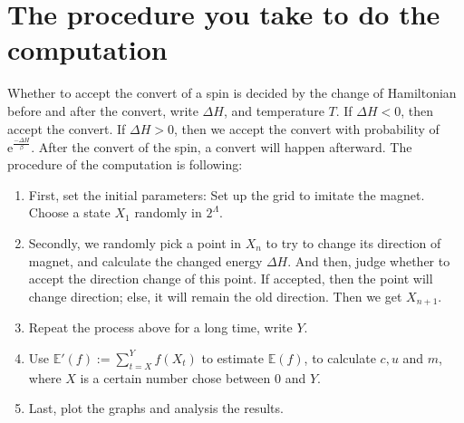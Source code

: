\documentclass[11pt,openany]{book}              %
\begin{document}
\section{The procedure you take to do the computation}
Whether to accept the convert of a spin is decided by the change of Hamiltonian before and after the convert, write \(\Delta H\), and temperature \(T\).
If \(\Delta H<0\), then accept the convert.
If \(\Delta H > 0 \), then we accept the convert with probability of \(\mathrm{e}^{\frac{- \Delta H}{\beta}}\).
After the convert of the spin, a convert will happen afterward.
The procedure of the computation is following:
\begin{enumerate}
	\item First, set the initial parameters: Set up the grid to imitate the magnet.
		Choose a state \(X_1\) randomly in \(2^\Lambda\).
	\item Secondly, we randomly pick a point in \(X_n\) to try to change its direction of magnet, and calculate the changed energy \(\Delta H\).
		And then, judge whether to accept the direction change of this point.
		If accepted, then the point will change direction; else, it will remain the old direction. Then we get \(X_{n+1}\).
	\item Repeat the process above for a long time, write \(Y\).
	\item Use \(\mathbb{E}'( f):=\sum_{t=X}^{Y} f( X_t)\) to estimate \(\mathbb{E}( f)\), to calculate \(c,u\) and \(m\), where \(X\) is a certain number chose between \(0\) and \(Y\).
	\item Last, plot the graphs and analysis the results.
\end{enumerate}
\end{document}
